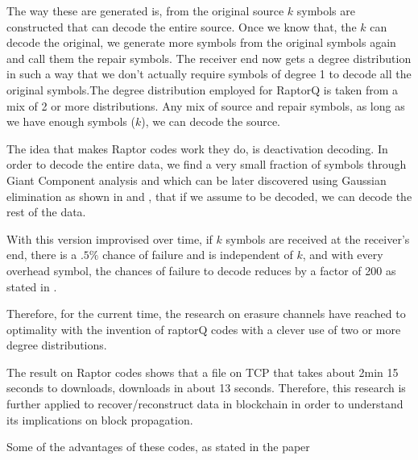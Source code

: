 The way these are generated is, from the original source $k$ symbols are
constructed that can decode the entire source. Once we know that, the $k$ can
decode the original, we generate more symbols from the original symbols again
and call them the repair symbols. The receiver end now gets a degree
distribution in such a way that we don't actually require symbols of degree 1 to
decode all the original symbols.The degree distribution employed for RaptorQ is
taken from a mix of 2 or more distributions. Any mix of source and repair symbols, as
long as we have enough symbols ($k$), we can decode the source. 

The idea that makes Raptor codes work they do, is deactivation decoding. In
order to decode the entire data, we find a very small fraction of symbols
through Giant Component analysis and which can be later discovered using
Gaussian elimination as shown in \citep{raptor-dev} and \citep{raptorQ}, that if we assume to be decoded, we can decode the
rest of the data.

With this version improvised over time, if $k$ symbols are received at the
receiver's end, there is a $.5\%$ chance of failure and is independent of $k$, and with every  overhead
symbol, the chances of failure to decode reduces by a factor of 200 as stated in \citep{fountain-pres}. 
 
Therefore, for the current time, the research on erasure channels have reached
to optimality with the invention of raptorQ codes with a clever use of two or
more degree distributions.

The result on Raptor codes shows that a file on TCP that takes about 2min 15
seconds to downloads, downloads in about 13 seconds.
Therefore, this research is further applied to recover/reconstruct data in
blockchain in order to understand its implications on block propagation.

Some of the advantages of these codes, as stated in the paper \cite{multicast}

